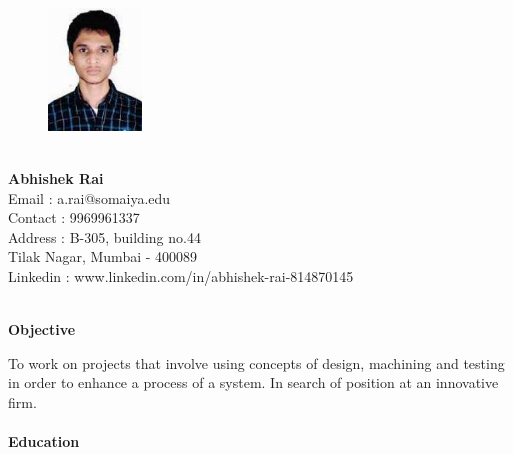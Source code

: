 \documentclass[letterpaper,11pt]{article}
\newcommand{\SmallSep}{\vspace{0.5em}}
\newcommand{\CVSection}[1]
{\Large\textbf{#1}\par
	\SmallSep\normalsize\normalfont}
\begin{document}
\begin{figure}
	\includegraphics[width=2.5cm]{PHOTO}
\end{figure} 

\textbf{}  \\
\textbf{{\Large Abhishek Rai}}  \\
Email \hspace{0.2cm}  : a.rai@somaiya.edu \\
Contact : 9969961337 \\
Address : B-305, building no.44 \\
\hspace{1.8cm}Tilak Nagar, Mumbai - 400089 \\ 
Linkedin : www.linkedin.com/in/abhishek-rai-814870145



\textbf{}  \\
\CVSection{Objective}
To work on projects that involve using concepts of design, machining and testing in order to enhance a process of a system. In search of position at an innovative firm.  \\

\textbf{}  \\
\CVSection{Education}
\end{document}
